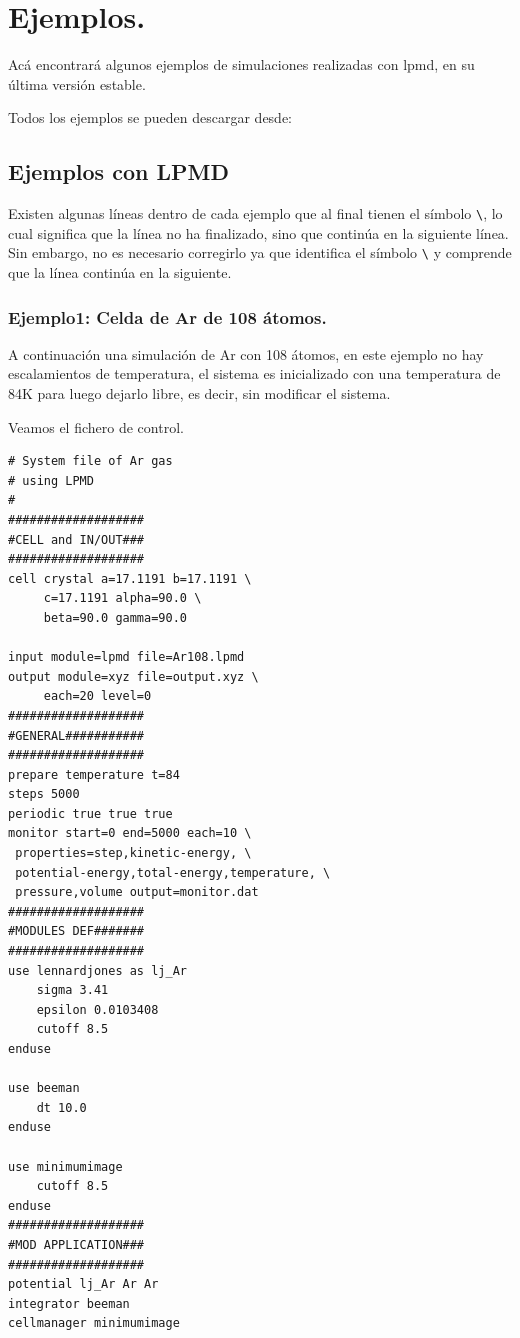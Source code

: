 \chapter{Ejemplos.}
\label{chap:exa}

Ac\'a encontrar\'a algunos ejemplos de simulaciones realizadas con lpmd, en su \'ultima versi\'on estable.

Todos los ejemplos se pueden descargar desde:



\section{Ejemplos con LPMD}

Existen algunas l\'ineas dentro de cada ejemplo que al final tienen el s\'imbolo \verb|\|, lo cual significa que la l\'inea no ha finalizado, sino que contin\'ua en la siguiente l\'inea. Sin embargo, no es necesario corregirlo ya que {\lpmd} identifica el s\'imbolo \verb|\| y comprende que la l\'inea contin\'ua en la siguiente. 

\subsection{Ejemplo1: Celda de Ar de 108 \'atomos.}

A continuaci\'on una simulaci\'on de Ar con 108 \'atomos, en este ejemplo no hay escalamientos de temperatura, el sistema es inicializado con una temperatura de 84K para luego dejarlo libre, es decir, sin modificar el sistema.

Veamos el fichero de control.

\begin{multicols}{2}
\setlength{\columnseprule}{.5pt}
\begin{verbatim}
# System file of Ar gas 
# using LPMD
#
###################
#CELL and IN/OUT###
###################
cell crystal a=17.1191 b=17.1191 \
     c=17.1191 alpha=90.0 \
     beta=90.0 gamma=90.0

input module=lpmd file=Ar108.lpmd
output module=xyz file=output.xyz \
     each=20 level=0
###################
#GENERAL###########
###################
prepare temperature t=84
steps 5000
periodic true true true
monitor start=0 end=5000 each=10 \
 properties=step,kinetic-energy, \
 potential-energy,total-energy,temperature, \
 pressure,volume output=monitor.dat
###################
#MODULES DEF#######
###################
use lennardjones as lj_Ar
    sigma 3.41
    epsilon 0.0103408
    cutoff 8.5
enduse

use beeman
    dt 10.0
enduse

use minimumimage
    cutoff 8.5
enduse
###################
#MOD APPLICATION###
###################
potential lj_Ar Ar Ar
integrator beeman
cellmanager minimumimage
\end{verbatim}
\end{multicols}


